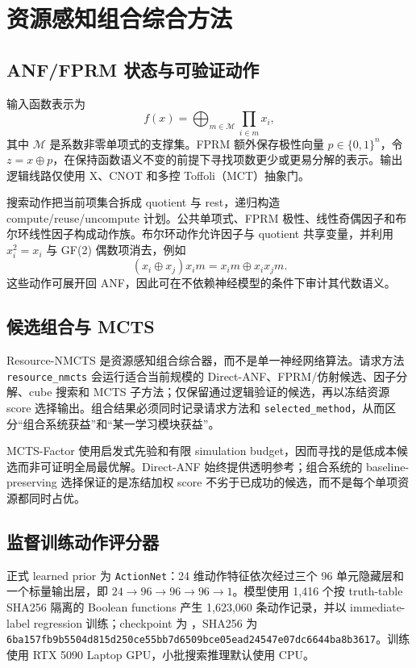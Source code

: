 \documentclass[UTF8,a4paper,12pt]{ctexart}
\newcommand{\xor}{\ensuremath{\oplus}}
\newcommand{\method}{Resource-NMCTS}
\begin{document}
\FloatBarrier
\section{资源感知组合综合方法}
\label{sec:method}

\subsection{ANF/FPRM 状态与可验证动作}

输入函数表示为
\begin{equation}
  f(x)=\bigoplus_{m\in\mathcal{M}}\prod_{i\in m}x_i,
  \label{eq:anf}
\end{equation}
其中 $\mathcal{M}$ 是系数非零单项式的支撑集。FPRM 额外保存极性向量 $p\in\{0,1\}^n$，令 $z=x\xor p$，在保持函数语义不变的前提下寻找项数更少或更易分解的表示。输出逻辑线路仅使用 X、CNOT 和多控 Toffoli（MCT）抽象门。

搜索动作把当前项集合拆成 quotient 与 rest，递归构造 compute/reuse/uncompute 计划。公共单项式、FPRM 极性、线性奇偶因子和布尔环线性因子构成动作族。布尔环动作允许因子与 quotient 共享变量，并利用 $x_i^2=x_i$ 与 GF(2) 偶数项消去，例如
\begin{equation}
  (x_i\xor x_j)x_i m=x_i m\xor x_i x_jm.
  \label{eq:boolean-ring}
\end{equation}
这些动作可展开回 ANF，因此可在不依赖神经模型的条件下审计其代数语义。

\subsection{候选组合与 MCTS}

\method{} 是资源感知组合综合器，而不是单一神经网络算法。请求方法 \texttt{resource\_nmcts} 会运行适合当前规模的 Direct-ANF、FPRM/仿射候选、因子分解、cube 搜索和 MCTS 子方法；仅保留通过逻辑验证的候选，再以冻结资源 score 选择输出。组合结果必须同时记录请求方法和 \texttt{selected\_method}，从而区分“组合系统获益”和“某一学习模块获益”。

MCTS-Factor 使用启发式先验和有限 simulation budget，因而寻找的是低成本候选而非可证明全局最优解。Direct-ANF 始终提供透明参考；组合系统的 baseline-preserving 选择保证的是冻结加权 score 不劣于已成功的候选，而不是每个单项资源都同时占优。

\subsection{监督训练动作评分器}

正式 learned prior 为 \texttt{ActionNet}：24 维动作特征依次经过三个 96 单元隐藏层和一个标量输出层，即 $24\to96\to96\to96\to1$。模型使用 1,416 个按 truth-table SHA256 隔离的 Boolean functions 产生 1,623,060 条动作记录，并以 immediate-label regression 训练；checkpoint 为 ，SHA256 为 \texttt{6ba157fb9b5504d815d250ce55bb7d6509bce05ead24547e07dc6644ba8b3617}。训练使用 RTX 5090 Laptop GPU，小批搜索推理默认使用 CPU。
\end{document}
